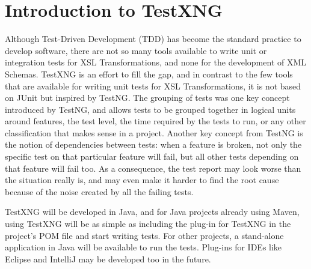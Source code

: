 %

\chapter{Introduction to TestXNG}

Although Test-Driven Development (TDD) has become the standard practice to develop software, there are not so many tools available to write unit or integration tests for XSL Transformations, and none for the development of XML Schemas. TestXNG is an effort to fill the gap, and in contrast to the few tools that are available for writing unit tests for XSL Transformations, it is not based on JUnit but inspired by TestNG. The grouping of tests was one key concept introduced by TestNG, and allows tests to be grouped together in logical units around features, the test level, the time required by the tests to run, or any other classification that makes sense in a project. Another key concept from TestNG is the notion of dependencies between tests: when a feature is broken, not only the specific test on that particular feature will fail, but all other tests depending on that feature will fail too. As a consequence, the test report may look worse than the situation really is, and may even make it harder to find the root cause because of the noise created by all the failing tests.

TestXNG will be developed in Java, and for Java projects already using Maven, using TestXNG will be as simple as including the plug-in for TestXNG in the project's POM file and start writing tests. For other projects, a stand-alone application in Java will be available to run the tests. Plug-ins for IDEs like Eclipse and IntelliJ may be developed too in the future.